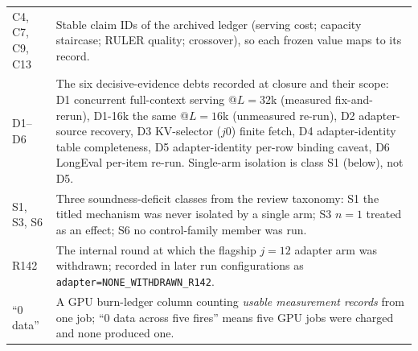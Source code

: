 \documentclass{article}
\newcommand{\code}[1]{\texttt{#1}}
\begin{document}
\begin{table}[!ht]
\begin{tabular}{@{}>{\raggedright\arraybackslash}p{2.0cm}>{\raggedright\arraybackslash}p{11.4cm}@{}}
\midrule
C4, C7, C9, C13 & Stable claim IDs of the archived ledger (serving cost; capacity staircase;
RULER quality; crossover), so each frozen value maps to its record. \\
\addlinespace
D1--D6 & The six decisive-evidence debts recorded at closure and their scope: D1 concurrent
full-context serving @$L{=}32$k (measured fix-and-rerun), D1-16k the same @$L{=}16$k (unmeasured
re-run), D2 adapter-source recovery, D3 KV-selector ($j0$) finite fetch, D4 adapter-identity
table completeness, D5 adapter-identity per-row binding caveat, D6 LongEval per-item re-run.
Single-arm isolation is class S1 (below), not D5. \\
\addlinespace
S1, S3, S6 & Three soundness-deficit classes from the review taxonomy: S1 the titled mechanism
was never isolated by a single arm; S3 $n{=}1$ treated as an effect; S6 no control-family member
was run. \\
\addlinespace
R142 & The internal round at which the flagship $j{=}12$ adapter arm was withdrawn; recorded in
later run configurations as \code{adapter=NONE\_WITHDRAWN\_R142}. \\
\addlinespace
``0 data'' & A GPU burn-ledger column counting \emph{usable measurement records} from one job;
``0 data across five fires'' means five GPU jobs were charged and none produced one. \\
\bottomrule
\end{tabular}
\end{table}
\end{document}
